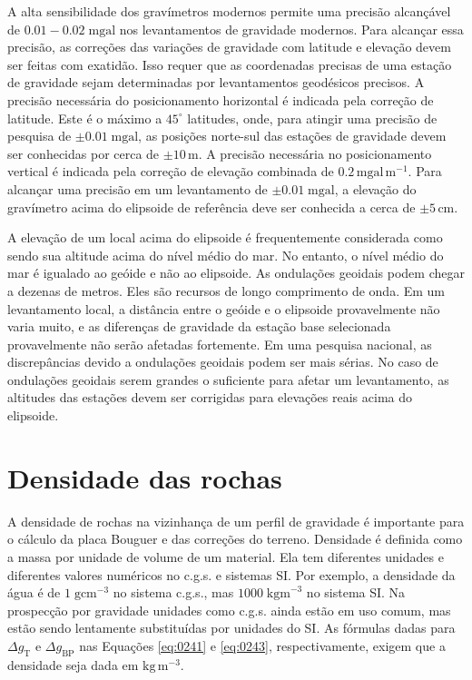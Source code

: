 \documentclass[]{book}
\theoremstyle{definition}
\theoremstyle{definition}
\theoremstyle{definition}
\theoremstyle{remark}
\begin{document}
A alta sensibilidade dos gravímetros modernos permite uma precisão alcançável de \(0.01 - 0.02\;\mathrm{mgal}\) nos levantamentos de gravidade modernos. Para alcançar essa precisão, as correções das variações de gravidade com latitude e elevação devem ser feitas com exatidão. Isso requer que as coordenadas precisas de uma estação de gravidade sejam determinadas por levantamentos geodésicos precisos. A precisão necessária do posicionamento horizontal é indicada pela correção de latitude. Este é o máximo a \(45^\circ\) latitudes, onde, para atingir uma precisão de pesquisa de \(\pm 0.01\; \mathrm{mgal}\), as posições norte-sul das estações de gravidade devem ser conhecidas por cerca de \(\pm 10\,\mathrm{m}\). A precisão necessária no posicionamento vertical é indicada pela correção de elevação combinada de \(0.2\,\mathrm{mgal}\,\mathrm{m}^{-1}\). Para alcançar uma precisão em um levantamento de \(\pm 0.01\; \mathrm{mgal}\), a elevação do gravímetro acima do elipsoide de referência deve ser conhecida a cerca de \(\pm 5\, \mathrm{cm}\).

A elevação de um local acima do elipsoide é frequentemente considerada como sendo sua altitude acima do nível médio do mar. No entanto, o nível médio do mar é igualado ao geóide e não ao elipsoide. As ondulações geoidais podem chegar a dezenas de metros. Eles são recursos de longo comprimento de onda. Em um levantamento local, a distância entre o geóide e o elipsoide provavelmente não varia muito, e as diferenças de gravidade da estação base selecionada provavelmente não serão afetadas fortemente. Em uma pesquisa nacional, as discrepâncias devido a ondulações geoidais podem ser mais sérias. No caso de ondulações geoidais serem grandes o suficiente para afetar um levantamento, as altitudes das estações devem ser corrigidas para elevações reais acima do elipsoide.

\hypertarget{densidade-das-rochas}{%
\section{Densidade das rochas}\label{densidade-das-rochas}}

A densidade de rochas na vizinhança de um perfil de gravidade é importante para o cálculo da placa Bouguer e das correções do terreno. Densidade é definida como a massa por unidade de volume de um material. Ela tem diferentes unidades e diferentes valores numéricos no c.g.s. e sistemas SI. Por exemplo, a densidade da água é de \(1\; \mathrm{g} \mathrm{cm}^{-3}\) no sistema c.g.s., mas \(1000\; \mathrm{kgm}^{-3}\) no sistema SI. Na prospecção por gravidade unidades como c.g.s. ainda estão em uso comum, mas estão sendo lentamente substituídas por unidades do SI. As fórmulas dadas para \(\Delta g_{\mathrm{T}}\) e \(\Delta g_{\mathrm{BP}}\) nas Equações \eqref{eq:0241} e \eqref{eq:0243}, respectivamente, exigem que a densidade seja dada em \(\mathrm{kg}\, \mathrm{m}^{-3}\).
\end{document}
